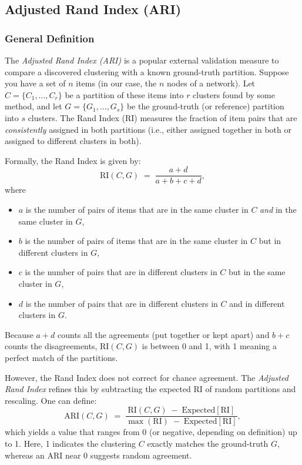 \subsection{Adjusted Rand Index (ARI)}
\label{subsec:ARI_definition}

\subsubsection{General Definition}
The \emph{Adjusted Rand Index (ARI)} is a popular external validation measure to compare a discovered clustering with a known ground-truth partition. Suppose you have a set of $n$ items (in our case, the $n$ nodes of a network). Let $C = \{C_1, \ldots, C_r\}$ be a partition of these items into $r$ clusters found by some method, and let $G = \{G_1, \ldots, G_s\}$ be the ground-truth (or reference) partition into $s$ clusters. The Rand Index (RI) measures the fraction of item pairs that are \emph{consistently} assigned in both partitions (i.e., either assigned together in both or assigned to different clusters in both). 

Formally, the Rand Index is given by:
\[
\mathrm{RI}(C,G) \;=\; \frac{a + d}{a + b + c + d},
\]
where 
\begin{itemize}
    \item $a$ is the number of pairs of items that are in the same cluster in $C$ \emph{and} in the same cluster in $G$,
    \item $b$ is the number of pairs of items that are in the same cluster in $C$ but in different clusters in $G$,
    \item $c$ is the number of pairs that are in different clusters in $C$ but in the same cluster in $G$,
    \item $d$ is the number of pairs that are in different clusters in $C$ and in different clusters in $G$.
\end{itemize}
Because $a+d$ counts all the agreements (put together or kept apart) and $b+c$ counts the disagreements, $\mathrm{RI}(C,G)$ is between 0 and 1, with 1 meaning a perfect match of the partitions.

However, the Rand Index does not correct for chance agreement. The \emph{Adjusted Rand Index} refines this by subtracting the expected RI of random partitions and rescaling. One can define:
\[
\mathrm{ARI}(C,G) \;=\; \frac{\mathrm{RI}(C,G)\;-\;\mathrm{Expected}[\mathrm{RI}]}{\max(\mathrm{RI})\;-\;\mathrm{Expected}[\mathrm{RI}]},
\]
which yields a value that ranges from 0 (or negative, depending on definition) up to 1. Here, 1 indicates the clustering $C$ exactly matches the ground-truth $G$, whereas an ARI near 0 suggests random agreement.

